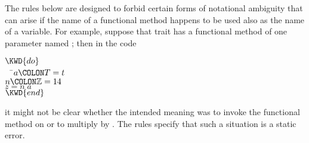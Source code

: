 The rules below are designed to forbid certain forms of notational ambiguity
that can arise if the name of a functional method happens to be used also
as the name of a variable.  For example, suppose that trait  has a functional
method of one parameter named ; then in the code
\begin{Fortress}
\(\KWD{do}\)\\
{\tt~~}\pushtabs\=\+\(  a\COLON T = t\)\\
\(  n\COLON \mathbb{Z} = 14\)\\
\(  z = n\; a\)\-\\\poptabs
\(\KWD{end}\)
\end{Fortress}
it might not be clear whether the intended meaning was to invoke
the functional method  on  or to multiply  by .
The rules specify that such a situation is a static error.

